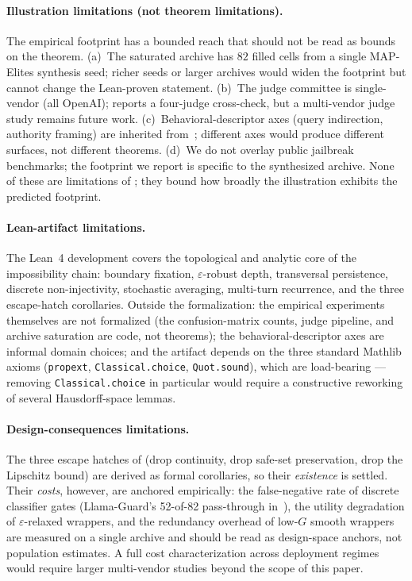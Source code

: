 \documentclass[11pt]{article}
\begin{document}
\paragraph{Illustration limitations (not theorem limitations).}
The empirical footprint has a bounded reach that should not be read
as bounds on the theorem. (a)~The saturated archive has $82$ filled
cells from a single MAP-Elites synthesis seed; richer seeds or larger
archives would widen the footprint but cannot change the Lean-proven
statement. (b)~The judge committee is single-vendor (all OpenAI);
 reports a four-judge cross-check, but a
multi-vendor judge study remains future work. (c)~Behavioral-descriptor
axes (query indirection, authority framing) are inherited
from~\cite{munshi2026manifold}; different axes would produce different
surfaces, not different theorems. (d)~We do not overlay public
jailbreak benchmarks; the footprint we report is specific to the
synthesized archive. None of these are limitations of
;
they bound how broadly the illustration exhibits the predicted
footprint.

\paragraph{Lean-artifact limitations.}
The Lean~4 development covers the topological and analytic core of
the impossibility chain: boundary fixation, $\varepsilon$-robust
depth, transversal persistence, discrete non-injectivity, stochastic
averaging, multi-turn recurrence, and the three escape-hatch
corollaries. Outside the formalization: the empirical experiments
themselves are not formalized (the confusion-matrix counts, judge
pipeline, and archive saturation are code, not theorems); the
behavioral-descriptor axes are informal domain choices; and the
artifact depends on the three standard Mathlib axioms
(\texttt{propext}, \texttt{Classical.choice}, \texttt{Quot.sound}),
which are load-bearing --- removing \texttt{Classical.choice} in
particular would require a constructive reworking of several
Hausdorff-space lemmas.

\paragraph{Design-consequences limitations.}
The three escape hatches of  (drop
continuity, drop safe-set preservation, drop the Lipschitz bound) are
derived as formal corollaries, so their \emph{existence} is settled.
Their \emph{costs}, however, are anchored empirically: the
false-negative rate of discrete classifier gates (Llama-Guard's
52-of-82 pass-through in~), the utility
degradation of $\varepsilon$-relaxed wrappers, and the redundancy
overhead of low-$G$ smooth wrappers are measured on a single archive
and should be read as design-space anchors, not population estimates.
A full cost characterization across deployment regimes would require
larger multi-vendor studies beyond the scope of this paper.
\end{document}
